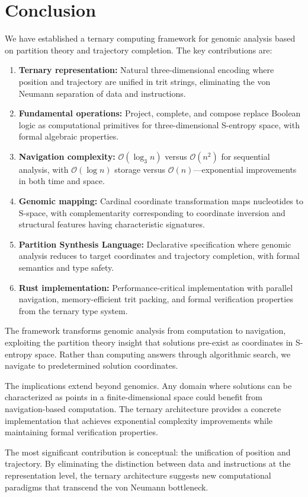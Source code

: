 \documentclass[twocolumn,10pt]{article}
\theoremstyle{remark}
\newcommand{\bigO}{\mathcal{O}}
\begin{document}
\section{Conclusion}

We have established a ternary computing framework for genomic analysis based on partition theory and trajectory completion. The key contributions are:

\begin{enumerate}
\item \textbf{Ternary representation:} Natural three-dimensional encoding where position and trajectory are unified in trit strings, eliminating the von Neumann separation of data and instructions.

\item \textbf{Fundamental operations:} Project, complete, and compose replace Boolean logic as computational primitives for three-dimensional S-entropy space, with formal algebraic properties.

\item \textbf{Navigation complexity:} $\bigO(\log_3 n)$ versus $\bigO(n^2)$ for sequential analysis, with $\bigO(\log n)$ storage versus $\bigO(n)$---exponential improvements in both time and space.

\item \textbf{Genomic mapping:} Cardinal coordinate transformation maps nucleotides to S-space, with complementarity corresponding to coordinate inversion and structural features having characteristic signatures.

\item \textbf{Partition Synthesis Language:} Declarative specification where genomic analysis reduces to target coordinates and trajectory completion, with formal semantics and type safety.

\item \textbf{Rust implementation:} Performance-critical implementation with parallel navigation, memory-efficient trit packing, and formal verification properties from the ternary type system.
\end{enumerate}

The framework transforms genomic analysis from computation to navigation, exploiting the partition theory insight that solutions pre-exist as coordinates in S-entropy space. Rather than computing answers through algorithmic search, we navigate to predetermined solution coordinates.

The implications extend beyond genomics. Any domain where solutions can be characterized as points in a finite-dimensional space could benefit from navigation-based computation. The ternary architecture provides a concrete implementation that achieves exponential complexity improvements while maintaining formal verification properties.

The most significant contribution is conceptual: the unification of position and trajectory. By eliminating the distinction between data and instructions at the representation level, the ternary architecture suggests new computational paradigms that transcend the von Neumann bottleneck.



\end{document}

